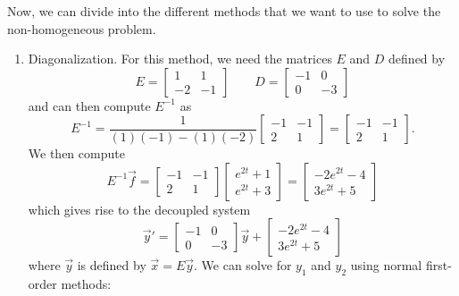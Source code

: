 \begin{exampleSol}
Now, we can divide into the different methods that we want to use to solve the non-homogeneous problem. 
\begin{enumerate}[1.]
\item Diagonalization. For this method, we need the matrices $E$ and $D$ defined by
\begin{equation*}
E = \begin{bmatrix} 1 & 1 \\ -2 & -1 \end{bmatrix} \qquad D = \begin{bmatrix} -1 & 0 \\ 0 & -3 \end{bmatrix} 
\end{equation*}
and can then compute $E^{-1}$ as 
\begin{equation*}
E^{-1} = \frac{1}{(1)(-1) - (1)(-2)} \begin{bmatrix} -1 & -1 \\ 2 & 1 \end{bmatrix} = \begin{bmatrix} -1 & -1 \\ 2 & 1 \end{bmatrix}.
\end{equation*}
We then compute 
\begin{equation*}
E^{-1}\vec{f} =  \begin{bmatrix} -1 & -1 \\ 2 & 1 \end{bmatrix} \begin{bmatrix} e^{2t} + 1 \\ e^{2t} + 3 \end{bmatrix} = \begin{bmatrix} -2e^{2t} - 4 \\ 3e^{2t} + 5 \end{bmatrix}
\end{equation*}
which gives rise to the decoupled system 
\begin{equation*}
\vec{y}' = \begin{bmatrix} -1 & 0 \\ 0 & -3 \end{bmatrix} \vec{y} + \begin{bmatrix} -2e^{2t} - 4 \\ 3e^{2t} + 5 \end{bmatrix}
\end{equation*} where $\vec{y}$ is defined by $\vec{x} = E\vec{y}$. We can solve for $y_1$ and $y_2$ using normal first-order methods:
\begin{minipage}{0.49\textwidth}

\end{minipage}
\end{enumerate}
\end{exampleSol}
